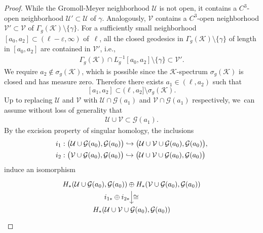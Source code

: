 \documentclass[11pt]{article}
\newcommand{\ie}{i.e.,\xspace}
\let\ts\textstyle
\let\epsilon\varepsilon
\newcommand\hto{\mathrel{\lhook\joinrel\to}}
\newcommand{\GG}{\mathcal{G}}
\newcommand{\KK}{\mathcal{K}}
\newcommand{\UU}{\mathcal{U}}
\newcommand{\VV}{\mathcal{V}}
\theoremstyle{plain}
\theoremstyle{definition}
\begin{document}
\begin{proof}
While the Gromoll-Meyer neighborhood $\UU$ is not open, it contains a $C^3$-open neighborhood $\UU'\subset\UU$ of $\gamma$. Analogously, $\VV$ contains a $C^3$-open neighborhood $\VV'\subset\VV$ of $\Gamma_g(\KK)\setminus\{\gamma\}$.
For a sufficiently small neighborhood $[a_0,a_2]\subset(\ell-\epsilon,\infty)$ of~$\ell$, all the closed geodesics in $\Gamma_g(\KK)\setminus\{\gamma\}$ of length in $[a_0,a_2]$ are contained in $\VV'$, \ie
\begin{align*}
\Gamma_g(\KK)\cap L_g^{-1}[a_0,a_2]\setminus\{\gamma\}\subset\VV'.
\end{align*}
We require $a_2\not\in\sigma_g(\KK)$, which is possible since the $\KK$-spectrum $\sigma_g(\KK)$ is closed and has measure zero. Therefore there exists $a_1\in(\ell,a_2)$ such that
\[
[a_1,a_2]\subset(\ell,a_2]\setminus\sigma_g(\KK).
\]
Up to replacing $\UU$ and $\VV$ with $\UU\cap\GG(a_1)$ and $\VV\cap\GG(a_1)$ respectively, we~can assume without loss of generality that
\begin{align*}
\UU\cup\VV\subset\GG(a_1).
\end{align*}
By the excision property of singular homology, the inclusions
\begin{align*}
&i_1:\big(\UU\cup\GG(a_0) , \GG(a_0)\big)
\hto
\big(\UU\cup\VV\cup\GG(a_0) , \GG(a_0)\big),\\
&i_2:\big(\VV\cup\GG(a_0) , \GG(a_0)\big)
\hto
\big(\UU\cup\VV\cup\GG(a_0) , \GG(a_0)\big)
\end{align*}
induce an isomorphism
\begin{equation}
\label{e:GM_splitting}
\begin{tikzcd}
H_*(\UU\cup\GG(a_0) , \GG(a_0))
\oplus
H_*(\VV\cup\GG(a_0) , \GG(a_0))
\arrow[d,"\ts \cong","\ts i_{1*}\oplus i_{2*}"']\\
H_*(\UU\cup\VV\cup\GG(a_0) , \GG(a_0))
\end{tikzcd}
\end{equation}


\end{proof}
\end{document}
